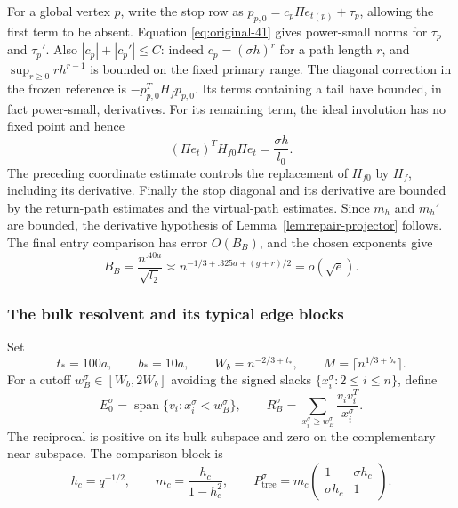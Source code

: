 For a global vertex $p$, write the stop row as
$p_{p,0}=c_p\Pi e_{t(p)}+\tau_p$, allowing the first term to be absent.
Equation \eqref{eq:original-41} gives power-small norms for $\tau_p$ and
$\tau_p'$.  Also $|c_p|+|c_p'|\le C$: indeed $c_p=(\sigma h)^r$ for a path
length $r$, and $\sup_{r\ge0}rh^{r-1}$ is bounded on the fixed primary range.
The diagonal correction in the frozen reference is $-p_{p,0}^TH_fp_{p,0}$.
Its terms containing a tail have bounded, in fact power-small, derivatives.
For its remaining term, the ideal involution has no fixed point and hence
\[
 (\Pi e_t)^TH_{f0}\Pi e_t=\frac{\sigma h}{l_0}.
\]
The preceding coordinate estimate controls the replacement of $H_{f0}$ by
$H_f$, including its derivative.  Finally the stop diagonal and its derivative
are bounded by the return-path estimates and the virtual-path estimates.
Since $m_h$ and $m_h'$ are bounded, the derivative hypothesis of
Lemma~\ref{lem:repair-projector} follows.  The final entry comparison has error
$O(B_B)$, and the chosen exponents give
\[
 B_B=\frac{n^{.40a}}{\sqrt{l_2}}
     \asymp n^{-1/3+.325a+(g+r)/2}=o(\sqrt e).
\]

\subsubsection*{The bulk resolvent and its typical edge blocks}
Set
\[
 t_*=100a,\qquad b_*=10a,\qquad
 W_b=n^{-2/3+t_*},\qquad M=\lceil n^{1/3+b_*}\rceil.
\]
For a cutoff $w_B^\sigma\in[W_b,2W_b]$ avoiding the signed slacks
$\{x_i^\sigma:2\le i\le n\}$, define
\[
 E_0^\sigma=\operatorname{span}\{v_i:x_i^\sigma<w_B^\sigma\},
 \qquad
 R_B^\sigma=\sum_{x_i^\sigma\ge w_B^\sigma}
            \frac{v_iv_i^T}{x_i^\sigma}.
\]
The reciprocal is positive on its bulk subspace and zero on the complementary
near subspace.  The comparison block is
\[
 h_c=q^{-1/2},\qquad m_c=\frac{h_c}{1-h_c^2},\qquad
 P_{\mathrm{tree}}^\sigma
 =m_c\begin{pmatrix}1&\sigma h_c\\ \sigma h_c&1\end{pmatrix}.
\]


